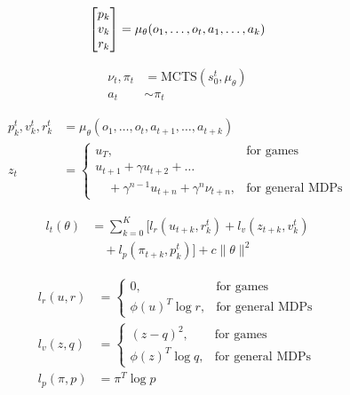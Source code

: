 \begin{equation}
    \setlength{\arraycolsep}{1.5pt} %
    \begin{bmatrix}
        p_k \\ v_k \\ r_k
    \end{bmatrix}
    =
    \mu_\theta(o_1, \ldots, o_t, a_1, \ldots, a_k)
    \label{eq:matrix}
\end{equation}

\begin{align}
    \nu_t, \pi_t & = \text{MCTS}(s_0^t, \mu_\theta) \\
    a_t          & \sim \pi_t
\end{align}

\begin{align}
    p_k^t, v_k^t, r_k^t & = \mu_\theta(o_1, \ldots, o_t, a_{t+1}, \ldots, a_{t+k}) \\
    z_t                 & =
    \begin{cases}
        u_T,                                               & \text{for games}        \\
        u_{t+1} + \gamma u_{t+2} + \ldots \nonumber                                  \\
        \quad + \gamma^{n-1} u_{t+n} + \gamma^n \nu_{t+n}, & \text{for general MDPs}
    \end{cases}
\end{align}

\begin{align}
    l_t(\theta) & =
    \sum_{k=0}^K \big[ l_r(u_{t+k}, r_k^t) + l_v(z_{t+k}, v_k^t) \nonumber \\
                & \quad + l_p(\pi_{t+k}, p_k^t) \big] + c \|\theta\|^2
\end{align}

\begin{align}
    l_r(u, r)   & =
    \begin{cases}
        0,                & \text{for games}        \\
        \phi(u)^T \log r, & \text{for general MDPs}
    \end{cases} \\
    l_v(z, q)   & =
    \begin{cases}
        (z - q)^2,        & \text{for games}        \\
        \phi(z)^T \log q, & \text{for general MDPs}
    \end{cases} \\
    l_p(\pi, p) & = \pi^T \log p
\end{align}

